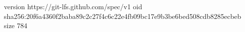 version https://git-lfs.github.com/spec/v1
oid sha256:20f6a4360f2baba89c2c27f4c6c22e4fb09bc17e9b3be6bed508cdb8285ecbeb
size 784
